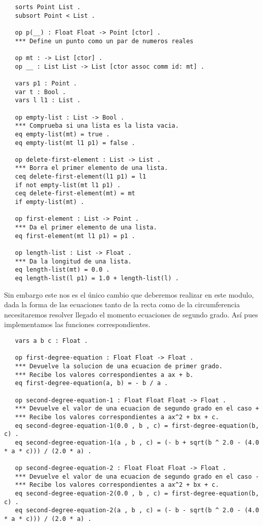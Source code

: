 \documentclass[12pt,a4paper]{book}
\begin{document}
\begin{verbatim}
   sorts Point List .
   subsort Point < List .

   op p(__) : Float Float -> Point [ctor] .
   *** Define un punto como un par de numeros reales

   op mt : -> List [ctor] .
   op __ : List List -> List [ctor assoc comm id: mt] . 

   vars p1 : Point .
   var t : Bool .
   vars l l1 : List .

   op empty-list : List -> Bool .
   *** Comprueba si una lista es la lista vacia.
   eq empty-list(mt) = true . 
   eq empty-list(mt l1 p1) = false .

   op delete-first-element : List -> List .
   *** Borra el primer elemento de una lista.
   ceq delete-first-element(l1 p1) = l1
   if not empty-list(mt l1 p1) .
   ceq delete-first-element(mt) = mt
   if empty-list(mt) .

   op first-element : List -> Point .
   *** Da el primer elemento de una lista.
   eq first-element(mt l1 p1) = p1 .

   op length-list : List -> Float .
   *** Da la longitud de una lista.
   eq length-list(mt) = 0.0 .
   eq length-list(l p1) = 1.0 + length-list(l) .

\end{verbatim}

Sin embargo este nos es el \'unico cambio que deberemos realizar en este modulo, dada la forma de las ecuaciones tanto de la recta como de la circumferencia necesitaremos resolver llegado el momento ecuaciones de segundo grado. As\'i pues implementamos las funciones correspondientes. \par

\begin{verbatim}
   vars a b c : Float .

   op first-degree-equation : Float Float -> Float .
   *** Devuelve la solucion de una ecuacion de primer grado.
   *** Recibe los valores correspondientes a ax + b.
   eq first-degree-equation(a, b) = - b / a .

   op second-degree-equation-1 : Float Float Float -> Float .
   *** Devuelve el valor de una ecuacion de segundo grado en el caso +
   *** Recibe los valores correspondientes a ax^2 + bx + c.
   eq second-degree-equation-1(0.0 , b , c) = first-degree-equation(b, c) .
   eq second-degree-equation-1(a , b , c) = (- b + sqrt(b ^ 2.0 - (4.0 * a * c))) / (2.0 * a) . 

   op second-degree-equation-2 : Float Float Float -> Float .
   *** Devuelve el valor de una ecuacion de segundo grado en el caso -
   *** Recibe los valores correspondientes a ax^2 + bx + c.
   eq second-degree-equation-2(0.0 , b , c) = first-degree-equation(b, c) .
   eq second-degree-equation-2(a , b , c) = (- b - sqrt(b ^ 2.0 - (4.0 * a * c))) / (2.0 * a) .

\end{verbatim}
\end{document}
